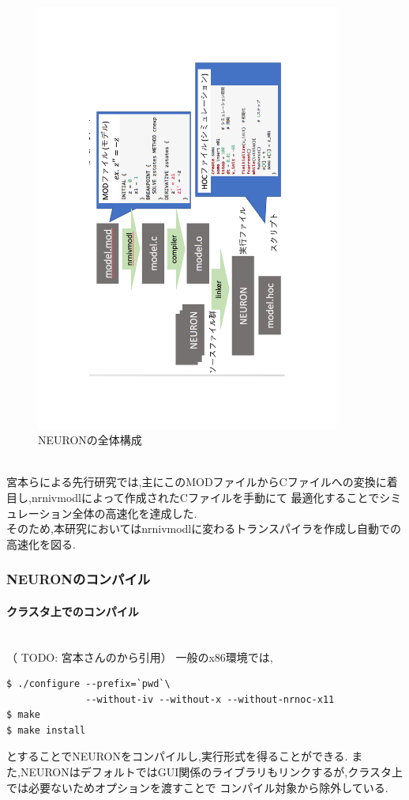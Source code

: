 \begin{figure}[htb]
  \begin{center}
    \includegraphics[width=10.0cm, angle=-90]{./images/neuron}
    \caption{NEURONの全体構成}
    \label{fig:neuron}
  \end{center}
\end{figure}~\\
宮本らによる先行研究では,主にこのMODファイルからCファイルへの変換に着目し,nrnivmodlによって作成されたCファイルを手動にて
最適化することでシミュレーション全体の高速化を達成した.\\
そのため,本研究においてはnrnivmodlに変わるトランスパイラを作成し自動での高速化を図る.\\

\subsubsection{NEURONのコンパイル}
\paragraph{クラスタ上でのコンパイル}~\\
（ TODO: 宮本さんのから引用）
一般のx86環境では,
{\footnotesize
\begin{lstlisting}[caption=クラスタでのNEURONのコンパイル,label=cluster-neuron-compile,numbers=none]
$ ./configure --prefix=`pwd`\
              --without-iv --without-x --without-nrnoc-x11
$ make
$ make install
\end{lstlisting}
}
とすることでNEURONをコンパイルし,実行形式を得ることができる.
また,NEURONはデフォルトではGUI関係のライブラリもリンクするが,クラスタ上では必要ないためオプションを渡すことで
コンパイル対象から除外している.\\
